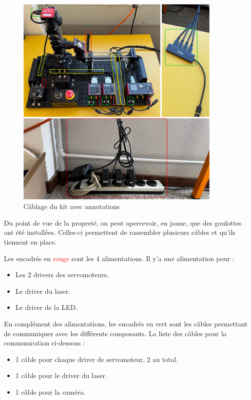 \begin{figure}[H]
    \begin{center}
        \includegraphics[width=0.9\textwidth]{assets/figures/Cablage_du_kit/Cablage_annote.png}
    \end{center}
    \caption{Câblage du kit avec annotations}
    \label{cablage_kit_annoté}
\end{figure}

Du point de vue de la propreté, on peut apercevoir, en \textcolor[RGB]{230, 230, 0}{jaune}, que des goulottes ont été installées. Celles-ci permettent de rassembler plusieurs câbles et qu'ils tiennent en place.

Les encadrés en \textcolor{red}{rouge} sont les 4 alimentations. Il y'a une alimentation pour :
\begin{itemize}
    \item Les 2 drivers des servomoteurs.
    \item Le driver du laser.
    \item Le driver de la LED.
\end{itemize}

En complément des alimentations, les encadrés en \textcolor[RGB]{0, 201, 18}{vert} sont les câbles permettant de communiquer avec les différents composants. La liste des câbles pour la communication ci-dessous :
\begin{itemize}
    \item 1 câble pour chaque driver de servomoteur, 2 au total.
    \item 1 câble pour le driver du laser.
    \item 1 câble pour la caméra.
\end{itemize}